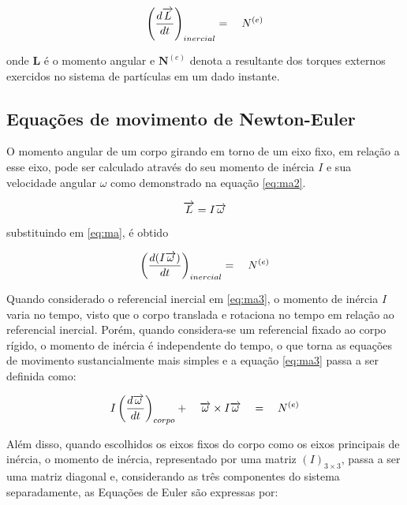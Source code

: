 \documentclass[a4paper, 12pt]{article}
\begin{document}
\begin{equation}
\centering
{ \left( \frac { d\overrightarrow { L } }{ dt }  \right)  }_{ inercial }=\quad { N }^{ (e) }
\label{eq:ma}
\end{equation}

\noindent onde $\mathbf{L}$ é o momento angular e ${ \mathbf{N} }^{ (e) }$ denota a resultante dos torques externos exercidos no sistema de partículas em um dado instante. 

\subsection{Equações de movimento de Newton-Euler}

O momento angular de um corpo girando em torno de um eixo fixo, em relação a esse eixo, pode ser calculado através do seu momento de inércia $I$ e sua velocidade angular $\omega$ como demonstrado na equação \ref{eq:ma2}.


\begin{equation}
\centering
 \overrightarrow { L } =I\overrightarrow { \omega } 
\label{eq:ma2}
\end{equation}

\noindent substituindo em \ref{eq:ma}, é obtido 

\begin{equation}
\centering
{ \left( \frac { d(I\overrightarrow { \omega  } ) }{ dt }  \right)  }_{ inercial }=\quad { N }^{ (e) }
\label{eq:ma3}
\end{equation}

Quando considerado o referencial inercial em \ref{eq:ma3}, o momento de inércia $I$ varia no tempo, visto que o corpo translada e rotaciona no tempo em relação ao referencial inercial. Porém, quando considera-se um referencial fixado ao corpo rígido, o momento de inércia é independente do tempo, o que torna as equações de movimento sustancialmente mais simples e a equação \ref{eq:ma3} passa a ser definida como:

\begin{equation}
\centering
{ I\left( \frac { d\overrightarrow { \omega  }  }{ dt }  \right)  }_{ corpo }+\quad \overrightarrow { \omega  } \times I\overrightarrow { \omega  } \quad =\quad { N }^{ (e) }
\label{eq:ma4}
\end{equation}

Além disso, quando escolhidos os eixos fixos do corpo como os eixos principais de inércia, o momento de inércia, representado por uma matriz $(I)_{3\times3}$, passa a ser uma matriz diagonal e, considerando as três componentes do sistema separadamente, as Equações de Euler são expressas por:
\end{document}
